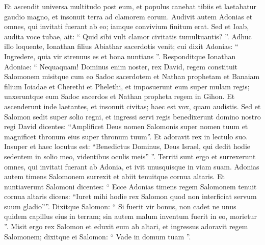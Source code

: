 \begin{biblechapter}
\verse Et ascendit universa multitudo post eum, et populus canebat tibiis et laetabatur gaudio magno, et insonuit terra ad clamorem eorum.
 \verse Audivit autem Adonias et omnes, qui invitati fuerant ab eo; iamque convivium finitum erat. Sed et Ioab, audita voce tubae, ait: “ Quid sibi vult clamor civitatis tumultuantis? ”. 
\verse Adhuc illo loquente, Ionathan filius Abiathar sacerdotis venit; cui dixit Adonias: “ Ingredere, quia vir strenuus es et bona nuntians ”. 
\verse Responditque Ionathan Adoniae: “ Nequaquam! Dominus enim noster, rex David, regem constituit Salomonem 
\verse misitque cum eo Sadoc sacerdotem et Nathan prophetam et Banaiam filium Ioiadae et Cherethi et Phelethi, et imposuerunt eum super mulam regis; 
\verse unxeruntque eum Sadoc sacerdos et Nathan propheta regem in Gihon. Et ascenderunt inde laetantes, et insonuit civitas; haec est vox, quam audistis. 
\verse Sed et Salomon sedit super solio regni, 
\verse et ingressi servi regis benedixerunt domino nostro regi David dicentes: “Amplificet Deus nomen Salomonis super nomen tuum et magnificet thronum eius super thronum tuum”. Et adoravit rex in lectulo suo. 
\verse Insuper et haec locutus est: “Benedictus Dominus, Deus Israel, qui dedit hodie sedentem in solio meo, videntibus oculis meis” ”.
 \verse Territi sunt ergo et surrexerunt omnes, qui invitati fuerant ab Adonia, et ivit unusquisque in viam suam. 
\verse Adonias autem timens Salomonem surrexit et abiit tenuitque cornua altaris.
 \verse Et nuntiaverunt Salomoni dicentes: “ Ecce Adonias timens regem Salomonem tenuit cornua altaris dicens: “Iuret mihi hodie rex Salomon quod non interficiat servum suum gladio””. 
\verse Dixitque Salomon: “ Si fuerit vir bonus, non cadet ne unus quidem capillus eius in terram; sin autem malum inventum fuerit in eo, morietur ”. 
\verse Misit ergo rex Salomon et eduxit eum ab altari, et ingressus adoravit regem Salomonem; dixitque ei Salomon: “ Vade in domum tuam ”.
 

\end{biblechapter}
